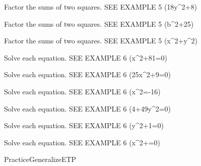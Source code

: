\documentclass{article}
\newenvironment{practice}[2]{}{}        %
\newenvironment{te-addendum}[2]{}{}     %
\newcommand{\answer}[1]{}               %
\newcommand{\te}[1]{}                   %
\begin{document}
\begin{practice}{37}{1}
Factor the sums of two squares. SEE EXAMPLE 5
(18y^2+8)
\answer{(2(3y-2i)(3y+2i))}
\end{practice}
\begin{practice}{38}{1}
Factor the sums of two squares. SEE EXAMPLE 5
(b^2+25)
\answer{((\frac{1}{2}b-5i)(\frac{1}{2}b+5i))}
\end{practice}
\begin{practice}{39}{1}
Factor the sums of two squares. SEE EXAMPLE 5
(x^2+y^2)
\answer{((x+yi)(x-yi))}
\end{practice}
\begin{practice}{40}{1}
Solve each equation. SEE EXAMPLE 6
(x^2+81=0)
\answer{(9i,-9i)}
\end{practice}
\begin{practice}{41}{1}
Solve each equation. SEE EXAMPLE 6
(25x^2+9=0)
\answer{(\frac{3}{5}i,-\frac{3}{5}i)}
\end{practice}
\begin{practice}{42}{1}
Solve each equation. SEE EXAMPLE 6
(x^2=-16)
\answer{(4i,-4i)}
\end{practice}
\begin{practice}{43}{1}
Solve each equation. SEE EXAMPLE 6
(4+49y^2=0)
\answer{(\frac{2}{7}i,-\frac{2}{7}i)}
\end{practice}
\begin{practice}{44}{1}
Solve each equation. SEE EXAMPLE 6
(y^2+1=0)
\answer{(i,-i)}
\end{practice}
\begin{practice}{45}{1}
Solve each equation. SEE EXAMPLE 6
(x^2+=0)
\answer{(\frac{1}{2}i,-\frac{1}{2}i)}
\end{practice}
\begin{te-addendum}{Practice}{GeneralizeETP}
\te{SavvasRealize.com. Practice. Practice \& Problem Solving is available at SavvasRealize.com. Answers for 11--13 are incorporated with those items.}
\end{te-addendum}
\end{document}
